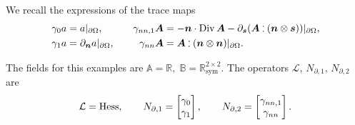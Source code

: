 We recall the expressions of the trace maps
\begin{equation}
\begin{aligned}
\gamma_{0}a &= a\vert_{\partial\Omega}, \\
\gamma_{1}a &= \partial_{\bm{n}} a \vert_{\partial\Omega},
\end{aligned}\qquad
\begin{aligned}
\gamma_{nn, 1}\bm{A} &= -\bm{n} \cdot \Div \bm{A} - \partial_{\bm{s}} (\bm{A} \cddot (\bm{n} \otimes \bm{s}))\vert_{\partial\Omega}, \\
\gamma_{nn}\bm{A} &= \bm{A} \cddot (\bm{n} \otimes \bm{n})\vert_{\partial\Omega}.
\end{aligned}
\end{equation}

The fields for this examples are $\mathbb{A}=\mathbb{R}, \;  \mathbb{B}=\mathbb{R}^{2\times 2}_{\text{sym}}$. The  operators $\mathcal{L}, \, N_{\partial, 1}, \, N_{\partial, 2}$ are
\begin{equation}
\mathcal{L}= \operatorname*{Hess}, \qquad
N_{\partial, 1} = \begin{bmatrix}
\gamma_0 \\ \gamma_1
\end{bmatrix}, \qquad 
N_{\partial, 2} = \begin{bmatrix}
\gamma_{nn,1} \\ \gamma_{nn}
\end{bmatrix}.
\end{equation}

